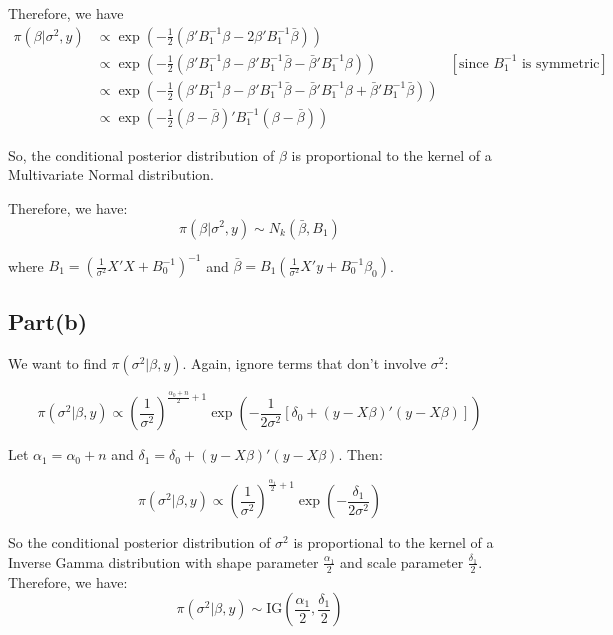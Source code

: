 \documentclass[a4paper]{article}
\begin{document}
    Therefore, we have
    \begin{align*}
        \pi(\beta|\sigma^2,y) &\propto \exp\left(-\frac{1}{2} \left( \beta' B_1^{-1} \beta - 2\beta'B_1^{-1} \bar{\beta} \right) \right)\\
        &\propto \exp\left(-\frac{1}{2} \left( \beta' B_1^{-1} \beta - \beta'B_1^{-1} \bar{\beta} - \bar{\beta}'B_1^{-1}\beta\right)  \right) & [\text{since \(B_1^{-1}\) is symmetric}]\\
        &\propto \exp\left(-\frac{1}{2} \left( \beta' B_1^{-1} \beta - \beta'B_1^{-1} \bar{\beta} - \bar{\beta}'B_1^{-1}\beta + \bar{\beta}'B_1^{-1}\bar{\beta}\right)\right)\\
        &\propto \exp\left(-\frac{1}{2} (\beta - \bar{\beta})' B_1^{-1} (\beta - \bar{\beta}) \right)
    \end{align*}

    So, the conditional posterior distribution of \(\beta\) is proportional to the kernel of a Multivariate Normal distribution.

    Therefore, we have:
    $$\pi(\beta | \sigma^2, y) \sim N_k(\bar{\beta}, B_1)$$
    
    where $B_1 = \left(\frac{1}{\sigma^2} X' X + B_0^{-1}\right)^{-1}$ and $\bar{\beta} = B_1 \left(\frac{1}{\sigma^2} X' y + B_0^{-1} \beta_0\right)$.

\subsection*{Part(b)}

    We want to find $\pi(\sigma^2 | \beta, y)$. Again, ignore terms that don't involve $\sigma^2$:
   
    $$\pi(\sigma^2 | \beta, y) \propto \left(\frac{1}{\sigma^2}\right)^{\frac{\alpha_0 + n}{2} + 1} \exp\left(-\frac{1}{2\sigma^2} \left[ \delta_0 + (y - X\beta)'(y - X\beta) \right] \right)$$

    Let \(\alpha_1 = \alpha_0 + n\) and \(\delta_1 = \delta_0 + (y-X\beta)'(y-X\beta)\). Then:

    $$\pi(\sigma^2|\beta,y) \propto \left(\frac{1}{\sigma^2}\right)^{\frac{\alpha_1}{2}+1} \exp\left(-\frac{\delta_1}{2\sigma^2}\right)$$

    So the conditional posterior distribution of \(\sigma^2\) is proportional to the kernel of a Inverse Gamma distribution with shape parameter \(\frac{\alpha_1}{2}\) and scale parameter \(\frac{\delta_1}{2}\).
    Therefore, we have:
    $$\pi(\sigma^2 | \beta, y) \sim \text{IG}\left(\frac{\alpha_1}{2}, \frac{\delta_1}{2}\right)$$
\end{document}
